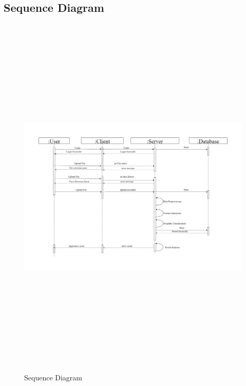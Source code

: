 
\subsection{Sequence Diagram}
\begin{figure}[h]
    \centering
    \includegraphics[height=7in,width= 6in ]{img/sequencediagram.drawio.png}
    \caption{Sequence Diagram}
\end{figure}
